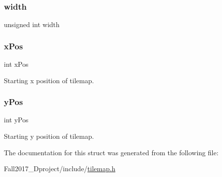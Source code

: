 \subsubsection{\texorpdfstring{width}{width}}
{\footnotesize\ttfamily unsigned int width}

\mbox{\label{structtilemap__s_a6806e78862b165988ca9b855e230084e}} 
\subsubsection{\texorpdfstring{x\+Pos}{xPos}}
{\footnotesize\ttfamily int x\+Pos}



Starting x position of tilemap. 

\mbox{\label{structtilemap__s_adbae1d6f68d046bbecaa7230baf64762}} 
\subsubsection{\texorpdfstring{y\+Pos}{yPos}}
{\footnotesize\ttfamily int y\+Pos}



Starting y position of tilemap. 



The documentation for this struct was generated from the following file\+:\begin{DoxyCompactItemize}
\item 
Fall2017\+\_\+Dproject/include/\hyperlink{tilemap_8h}{tilemap.\+h}\end{DoxyCompactItemize}
